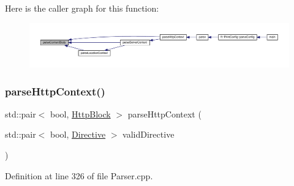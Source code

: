 Here is the caller graph for this function\+:
\nopagebreak
\begin{figure}[H]
\begin{center}
\leavevmode
\includegraphics[width=350pt]{classft_1_1_parser_a2d0fd9222eca5d8ea7e8fbb79f0a30be_icgraph}
\end{center}
\end{figure}
\mbox{\label{classft_1_1_parser_a17a213759b2cca8e91ca225b2e86739d}} 
\subsubsection{\texorpdfstring{parse\+Http\+Context()}{parseHttpContext()}}
{\footnotesize\ttfamily std\+::pair$<$ bool, \hyperlink{classft_1_1_http_block}{Http\+Block} $>$ parse\+Http\+Context (\begin{DoxyParamCaption}\item[{std\+::pair$<$ bool, \hyperlink{classft_1_1_directive}{Directive} $>$}]{valid\+Directive }\end{DoxyParamCaption})\hspace{0.3cm}{\ttfamily [private]}}



Definition at line 326 of file Parser.\+cpp.


